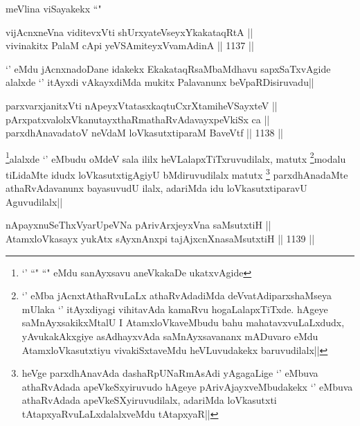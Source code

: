 \begin{artha}
meVlina viSayakekx ``\stext"
\end{artha}


\begin{shl}
vijAcnxneVna viditevxVti shUrxyateV\s seyxYkakataqRtA || \\
vivinakitx PalaM cApi yeVSAmiteyxVvamAdinA ||  1137 ||  
\end{shl}

\begin{artha}
`\stext' eMdu jAcnxnadoDane idakekx EkakataqRsaMbaMdhavu sapxSaTxvAgide alalxde `\stext' itAyxdi vAkayxdiMda mukitx Palavanunx beVpaRDisiruvadu||
\end{artha}

\begin{shl}
parxvarxjanitxVti nApeyxVtatasxkaqtuCxrXtamiheVSayxteV || \\
pArxpatxvalolxVkanutayxthaRmathaRvAdavayxpeVkiSx ca || \\
parxdhAnavadatoV neVdaM loVkasutxtiparaM BaveVtf ||  1138 ||  
\end{shl}

\begin{artha}
\footnote{`\stext' ``\stext" ``\stext" eMdu sanAyxsavu aneVkakaDe ukatxvAgide}alalxde `\stext' eMbudu oMdeV sala ililx heVLalapxTiTxruvudilalx, matutx \footnote{`\stext' eMba jAcnxtAthaRvuLaLx athaRvAdadiMda deVvatAdiparxshaMseya mUlaka `\stext' itAyxdiyagi vihitavAda kamaRvu hogaLalapxTiTxde. hAgeye saMnAyxsakikxMtalU I AtamxloVkaveMbudu bahu mahatavxvuLaLxdudx, yAvukakAkxgiye asAdhayxvAda saMnAyxsavananx mADuvaro eMdu AtamxloVkasutxtiyu vivakiSxtaveMdu heVLuvudakekx baruvudilalx||}modalu tiLidaMte idudx loVkasutxtigAgiyU bMdiruvudilalx matutx \footnote{heVge parxdhAnavAda dashaRpUNaRmAsAdi yAgagaLige `\stext' eMbuva athaRvAdada apeVkeSxyiruvudo hAgeye pArivAjayxveMbudakekx `\stext' eMbuva athaRvAdada apeVkeSXyiruvudilalx, adariMda loVkasutxti tAtapxyaRvuLaLxdalalxveMdu tAtapxyaR||} parxdhAnadaMte athaRvAdavanunx bayasuvudU ilalx, adariMda idu loVkasutxtiparavU Aguvudilalx||
\end{artha}

\begin{shl}
nApayxnuSeThxVyarUpeVNa pArivArxjeyxVna saMsutxtiH || \\
AtamxloVkasayx yukAtx sAyxnAnxpi tajAjxcnXnasaMsutxtiH ||  1139 ||  
\end{shl}

